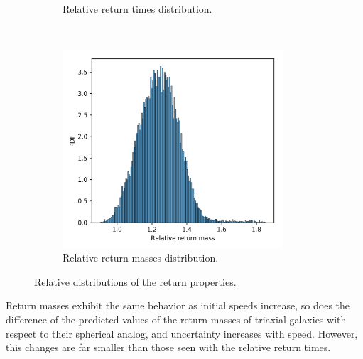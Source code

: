 \begin{figure}[h!]
\begin{subfigure}[b]{0.49\textwidth}
			\caption{Relative return times distribution.}
			\label{fig: relTimeDist}
		\end{subfigure}
		~ 
		\begin{subfigure}[b]{0.49\textwidth}
			\includegraphics[width = 0.9\textwidth]{"../Files/Week 14/relative_mass_dist"}
			\caption{Relative return masses distribution.}
			\label{fig: relMassDist}
		\end{subfigure}
		\caption{Relative distributions of the return properties.}
		\label{fig: relatives}
	\end{figure}

	Return masses exhibit the same behavior as initial speeds increase, so does the difference of the predicted values of the return masses of triaxial galaxies with respect to their spherical analog, and uncertainty increases with speed. However, this changes are far smaller than those seen with the relative return times.
	

